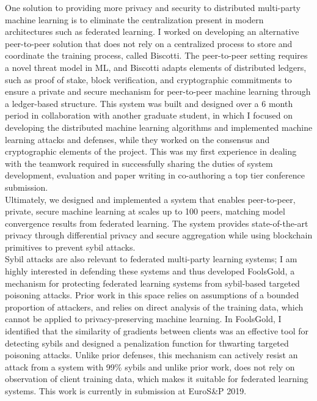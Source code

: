 \documentclass[10pt]{article} %
\begin{document}
One solution to providing more privacy and security to distributed multi-party machine learning is to eliminate the centralization present in modern architectures such as federated learning. I worked on developing an alternative peer-to-peer solution that does not rely on a centralized process to store and coordinate the training process, called Biscotti. 
%
The peer-to-peer setting requires a novel threat model in ML, and Biscotti adapts elements of distributed ledgers, such as proof of stake, block verification, and cryptographic commitments to ensure a private and secure mechanism for peer-to-peer machine learning through a ledger-based structure. This system was built and designed over a 6 month period in collaboration with another graduate student, in which I focused on developing the distributed machine learning algorithms and implemented machine learning attacks and defenses, while they worked on the consensus and cryptographic elements of the project. This was my first experience in dealing with the teamwork required in successfully sharing the duties of system development, evaluation and paper writing in co-authoring a top tier conference submission. \\

Ultimately, we designed and implemented a system that enables peer-to-peer, private, secure machine learning at scales up to 100 peers, matching model convergence results from federated learning. The system provides state-of-the-art privacy through differential privacy and secure aggregation while using blockchain primitives to prevent sybil attacks.\\

Sybil attacks are also relevant to federated multi-party learning systems; I am highly interested in defending these systems and thus developed FoolsGold, a mechanism for protecting federated learning systems from sybil-based targeted poisoning attacks. Prior work in this space relies on assumptions of a bounded proportion of attackers, and relies on direct analysis of the training data, which cannot be applied to privacy-preserving machine learning. In FoolsGold, I identified that the similarity of gradients between clients was an effective tool for detecting sybils and designed a penalization function for thwarting targeted poisoning attacks. Unlike prior defenses, this mechanism can actively resist an attack from a system with 99\% sybils and unlike prior work, does not rely on observation of client training data, which makes it suitable for federated learning systems. This work is currently in submission at EuroS\&P 2019. \\
\end{document}
